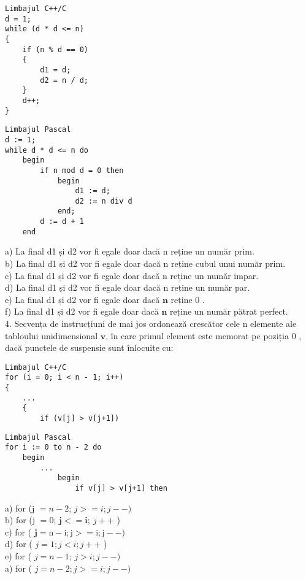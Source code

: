\begin{verbatim}
Limbajul C++/C
d = 1;
while (d * d <= n)
{
    if (n % d == 0)
    {
        d1 = d;
        d2 = n / d;
    }
    d++;
}
\end{verbatim}

\begin{verbatim}
Limbajul Pascal
d := 1;
while d * d <= n do
    begin
        if n mod d = 0 then
            begin
                d1 := d;
                d2 := n div d
            end;
        d := d + 1
    end
\end{verbatim}

a) La final d1 și d2 vor fi egale doar dacă n reține un număr prim.\\
b) La final d1 și d2 vor fi egale doar dacă n reține cubul unui număr prim.\\
c) La final d1 și d2 vor fi egale doar dacă n reține un număr impar.\\
d) La final d1 ș̦i d2 vor fi egale doar dacă n reține un număr par.\\
e) La final d1 și d2 vor fi egale doar dacă $\mathbf{n}$ reține 0 .\\
f) La final d1 și d2 vor fi egale doar dacă $\mathbf{n}$ reține un număr pătrat perfect.\\
4. Secvența de instrucțiuni de mai jos ordonează crescător cele n elemente ale tabloului unidimensional $\mathbf{v}$, în care primul element este memorat pe poziția 0 , dacă punctele de suspensie sunt înlocuite cu:

\begin{verbatim}
Limbajul C++/C
for (i = 0; i < n - 1; i++)
{
    ...
    {
        if (v[j] > v[j+1])
\end{verbatim}

\begin{verbatim}
Limbajul Pascal
for i := 0 to n - 2 do
    begin
        ...
            begin
                if v[j] > v[j+1] then
\end{verbatim}

a) for (j $=n-2$; $j>=i ; j--)$\\
b) for (j $=0$; $\mathbf{j}<=\mathbf{i} ; ~ j++$ )\\
c) for ( $\mathbf{j}=\mathrm{n}-\mathrm{i} ; \mathrm{j}>=\mathrm{i} ; \mathrm{j}-\mathrm{-})$\\
d) for ( $j=1 ; j<i ; j++$ )\\
e) for ( $j=n-1$; $j>i ; j--)$\\
a) for ( $j=n-2 ; j>=i ; j--)$

